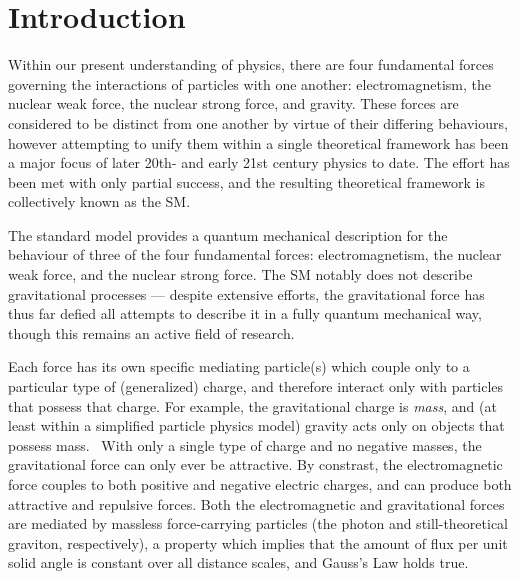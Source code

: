 \section{Introduction}
\label{section:intro}
Within our present understanding of physics, there are four fundamental forces governing the interactions of particles with one another:  electromagnetism, the nuclear weak force, the nuclear strong force, and gravity.  These forces are considered to be distinct from one another by virtue of their differing behaviours, however attempting to unify them within a single theoretical framework has been a major focus of later 20th- and early 21st century physics to date.  The effort has been met with only partial success, and the resulting theoretical framework is collectively known as the \ac{SM}.

The standard model provides a quantum mechanical description for
the behaviour of three of the four fundamental forces:  electromagnetism, the nuclear weak force, and the nuclear strong force.  The \ac{SM} notably does not describe gravitational processes --- despite extensive efforts, the gravitational force has thus far defied all attempts to describe it in a fully quantum mechanical way, though this remains an active field of research.  

%
Each force has its own specific mediating particle(s) which couple only to a particular type of (generalized) charge, and therefore interact only with particles that possess that charge.  For example, the gravitational charge is \emph{mass}, and (at least within a simplified particle physics model) gravity acts only on objects that possess mass.~  With only a single type of charge and no negative masses, the gravitational force can only ever be attractive.
%
By constrast, the electromagnetic force couples to both positive and negative electric charges, and can produce both attractive and repulsive forces.  Both the electromagnetic and gravitational forces are mediated by massless force-carrying particles (the photon and still-theoretical graviton, respectively), a property which implies that the amount of flux per unit solid angle is constant over all distance scales, and Gauss's Law holds true.

